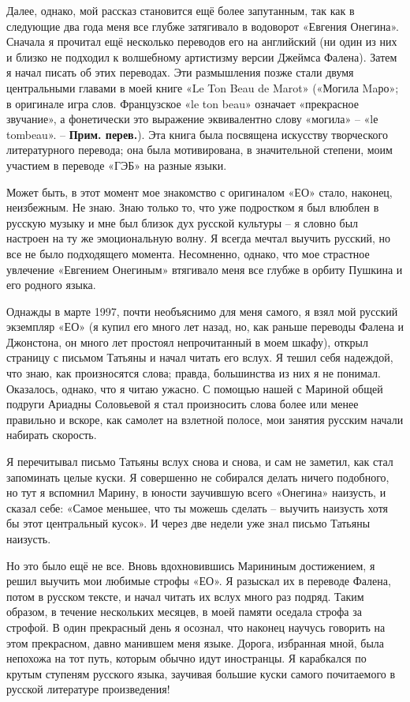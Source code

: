 \documentclass[../main.tex]{subfiles}
\begin{document}
Далее, однако, мой рассказ становится ещё более запутанным, так как в следующие два года меня все глубже затягивало в водоворот «Евгения Онегина». Сначала я прочитал ещё несколько переводов его на английский (ни один из них и близко не подходил к волшебному артистизму версии Джеймса Фалена). Затем я начал писать об этих переводах. Эти размышления позже стали двумя центральными главами в моей книге «Le Ton Beau de Marot» («Могила Maро»; в оригинале игра слов. Французское «le ton beau» означает «прекрасное звучание», а фонетически это выражение эквивалентно слову «могила» \--- «lе tombeau». \--- \textbf{Прим. перев.}). Эта книга была посвящена искусству творческого литературного перевода; она была мотивирована, в значительной степени, моим участием в переводе «ГЭБ» на разные языки.

Может быть, в этот момент мое знакомство с оригиналом «ЕО» стало, наконец, неизбежным. Не знаю. Знаю только то, что уже подростком я был влюблен в русскую музыку и мне был близок дух русской культуры \--- я словно был настроен на ту же эмоциональную волну. Я всегда мечтал выучить русский, но все не было подходящего момента. Несомненно, однако, что мое страстное увлечение «Евгением Онегиным» втягивало меня все глубже в орбиту Пушкина и его родного языка.

Однажды в марте 1997, почти необъяснимо для меня самого, я взял мой русский экземпляр «ЕО» (я купил его много лет назад, но, как раньше переводы Фалена и Джонстона, он много лет простоял непрочитанный в моем шкафу), открыл страницу с письмом Татьяны и начал читать его вслух. Я тешил себя надеждой, что знаю, как произносятся слова; правда, большинства из них я не понимал. Оказалось, однако, что я читаю ужасно. С помощью нашей с Мариной общей подруги Ариадны Соловьевой я стал произносить слова более или менее правильно и вскоре, как самолет на взлетной полосе, мои занятия русским начали набирать скорость.

Я перечитывал письмо Татьяны вслух снова и снова, и сам не заметил, как стал запоминать целые куски. Я совершенно не собирался делать ничего подобного, но тут я вспомнил Марину, в юности заучившую всего «Онегина» наизусть, и сказал себе: «Самое меньшее, что ты можешь сделать \--- выучить наизусть хотя бы этот центральный кусок». И через две недели уже знал письмо Татьяны наизусть.

Но это было ещё не все. Вновь вдохновившись Марининым достижением, я решил выучить мои любимые строфы «ЕО». Я разыскал их в переводе Фалена, потом в русском тексте, и начал читать их вслух много раз подряд. Таким образом, в течение нескольких месяцев, в моей памяти оседала строфа за строфой. В один прекрасный день я осознал, что наконец научусь говорить на этом прекрасном, давно манившем меня языке. Дорога, избранная мной, была непохожа на тот путь, которым обычно идут иностранцы. Я карабкался по крутым ступеням русского языка, заучивая большие куски самого почитаемого в русской литературе произведения!
\end{document}
